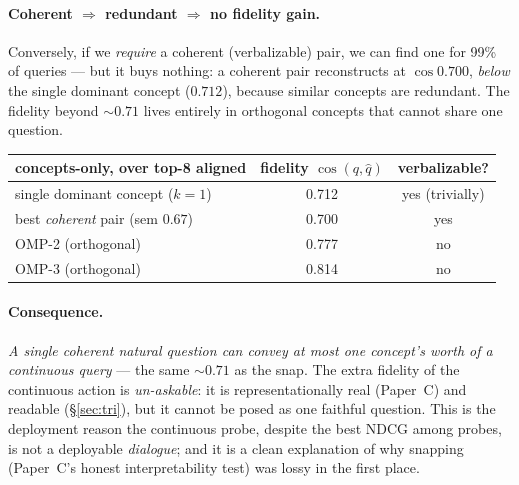\documentclass[11pt]{article}
\newcommand{\qhat}{\hat q}
\begin{document}
\paragraph{Coherent $\Rightarrow$ redundant $\Rightarrow$ no fidelity gain.} Conversely, if we \emph{require} a
coherent (verbalizable) pair, we can find one for 99\% of queries --- but it buys nothing: a coherent pair
reconstructs at $\cos 0.700$, \emph{below} the single dominant concept ($0.712$), because similar concepts are
redundant. The fidelity beyond $\sim\!0.71$ lives entirely in orthogonal concepts that cannot share one question.
\begin{center}\small
\begin{tabular}{lcc}
\toprule
concepts-only, over top-8 aligned & fidelity $\cos(q,\qhat)$ & verbalizable?\\
\midrule
single dominant concept ($k{=}1$)      & 0.712 & yes (trivially)\\
best \emph{coherent} pair (sem $0.67$) & 0.700 & yes\\
OMP-2 (orthogonal)                     & 0.777 & no\\
OMP-3 (orthogonal)                     & 0.814 & no\\
\bottomrule
\end{tabular}
\end{center}

\paragraph{Consequence.} \emph{A single coherent natural question can convey at most one concept's worth of a
continuous query} --- the same $\sim0.71$ as the snap. The extra fidelity of the continuous action is
\emph{un-askable}: it is representationally real (Paper~C) and readable (\S\ref{sec:tri}), but it cannot be posed as
one faithful question. This is the deployment reason the continuous probe, despite the best NDCG among probes, is not
a deployable \emph{dialogue}; and it is a clean explanation of why snapping (Paper~C's honest interpretability test)
was lossy in the first place.
\end{document}
